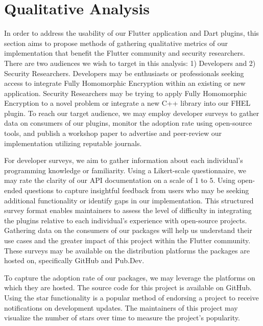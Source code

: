\section{Qualitative Analysis}


In order to address the usability of our Flutter application and Dart plugins, this section aims to propose methods of gathering qualitative metrics of our implementation that benefit the Flutter community and security researchers. There are two audiences we wish to target in this analysis: 1) Developers and 2) Security Researchers. Developers may be enthusiasts or professionals seeking access to integrate Fully Homomorphic Encryption within an existing or new application. Security Researchers may be trying to apply Fully Homomorphic Encryption to a novel problem or integrate a new C++ library into our FHEL plugin. To reach our target audience, we may employ developer surveys to gather data on consumers of our plugins, monitor the adoption rate using open-source tools, and publish a workshop paper to advertise and peer-review our implementation utilizing reputable journals.

For developer surveys, we aim to gather information about each individual's programming knowledge or familiarity. Using a Likert-scale questionnaire, we may rate the clarity of our API documentation on a scale of 1 to 5. Using open-ended questions to capture insightful feedback from users who may be seeking additional functionality or identify gaps in our implementation. This structured survey format enables maintainers to assess the level of difficulty in integrating the plugins relative to each individual's experience with open-source projects. Gathering data on the consumers of our packages will help us understand their use cases and the greater impact of this project within the Flutter community. These surveys may be available on the distribution platforms the packages are hosted on, specifically GitHub and Pub.Dev.

To capture the adoption rate of our packages, we may leverage the platforms on which they are hosted. The source code for this project is available on GitHub. Using the star functionality is a popular method of endorsing a project to receive notifications on development updates. The maintainers of this project may visualize the number of stars over time to measure the project's popularity.

